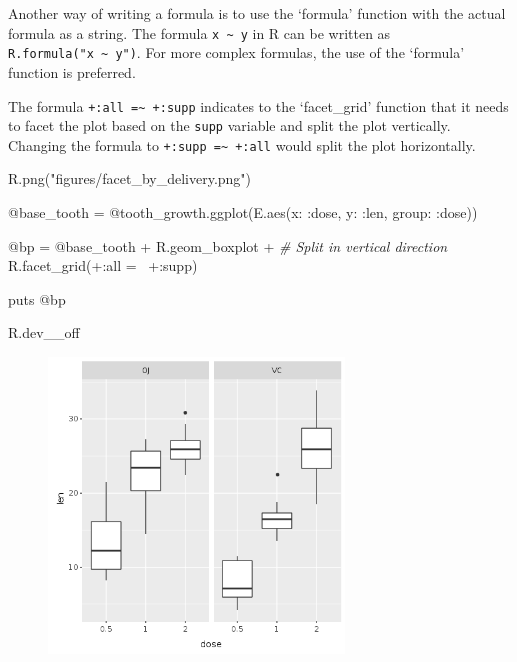 \documentclass[11pt,]{article}
\newenvironment{Shaded}{\begin{snugshade}}{\end{snugshade}}
\newcommand{\StringTok}[1]{\textcolor[rgb]{0.31,0.60,0.02}{#1}}
\newcommand{\CommentTok}[1]{\textcolor[rgb]{0.56,0.35,0.01}{\textit{#1}}}
\newcommand{\OtherTok}[1]{\textcolor[rgb]{0.56,0.35,0.01}{#1}}
\newcommand{\NormalTok}[1]{#1}
\begin{document}
Another way of writing a formula is to use the `formula' function with
the actual formula as a string. The formula
\texttt{x\ \textasciitilde{}\ y} in R can be written as
\texttt{R.formula("x\ \textasciitilde{}\ y")}. For more complex
formulas, the use of the `formula' function is preferred.

The formula \texttt{+:all\ =\textasciitilde{}\ +:supp} indicates to the
`facet\_grid' function that it needs to facet the plot based on the
\texttt{supp} variable and split the plot vertically. Changing the
formula to \texttt{+:supp\ =\textasciitilde{}\ +:all} would split the
plot horizontally.

\begin{Shaded}
\begin{Highlighting}[]
\NormalTok{R.png(}\StringTok{"figures/facet_by_delivery.png"}\NormalTok{)}

\OtherTok{@base_tooth}\NormalTok{ = }\OtherTok{@tooth_growth}\NormalTok{.ggplot(E.aes(}\StringTok{x: :dose}\NormalTok{, }\StringTok{y: :len}\NormalTok{, }\StringTok{group: :dose}\NormalTok{))}

\OtherTok{@bp}\NormalTok{ = }\OtherTok{@base_tooth}\NormalTok{ + R.geom_boxplot +}
      \CommentTok{# Split in vertical direction}
\NormalTok{      R.facet_grid(+}\StringTok{:all}\NormalTok{ =~ +}\StringTok{:supp}\NormalTok{)}
      
\NormalTok{puts }\OtherTok{@bp}

\NormalTok{R.dev__off}
\end{Highlighting}
\end{Shaded}

\begin{figure}
\centering
\includegraphics[width=0.70000\textwidth]{figures/facet_by_delivery.png}
\caption{}
\end{figure}
\end{document}
